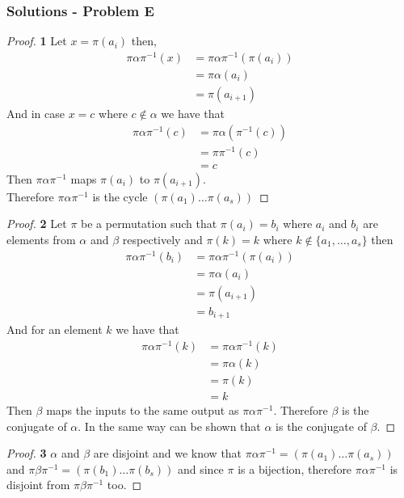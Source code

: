 \documentclass[11pt]{article}
\begin{document}
	\subsubsection*{Solutions - Problem E}
		\begin{proof}{\textbf{1}}
			Let $x = \pi(a_i)$ then,
			\begin{align*}
				\pi\alpha\pi^{-1}(x) &= \pi\alpha\pi^{-1}(\pi(a_i)) \\
									 &= \pi\alpha(a_i) \\
									 &= \pi(a_{i+1})
			\end{align*}
			And in case $x=c$ where $c \notin \alpha$ we have that
			\begin{align*}
				\pi\alpha\pi^{-1}(c) &= \pi\alpha(\pi^{-1}(c)) \\
									 &= \pi\pi^{-1}(c) \\
									 &= c
			\end{align*}
			Then $\pi\alpha\pi^{-1}$ maps $\pi(a_i)$ to $\pi(a_{i+1})$. \\ 
			Therefore $\pi\alpha\pi^{-1}$ is the cycle $(\pi(a_1) \dots \pi(a_s))$
		\end{proof}
\cleardoublepage
		\begin{proof}{\textbf{2}}
			Let $\pi$ be a permutation such that $\pi(a_i) = b_i$ where $a_i$
			and $b_i$ are elements from $\alpha$ and $\beta$ respectively and 
			$\pi(k) = k$ where $k \notin \{a_1, \dots, a_s\}$
			then
			\begin{align*}
				\pi\alpha\pi^{-1}(b_i) &= \pi\alpha\pi^{-1}(\pi(a_i)) \\
									   &= \pi\alpha(a_i) \\
									   &= \pi(a_{i+1}) \\
									   &= b_{i+1}
			\end{align*}
			And for an element $k$ we have that
			\begin{align*}
				\pi\alpha\pi^{-1}(k) &= \pi\alpha\pi^{-1}(k) \\
									   &= \pi\alpha(k) \\
									   &= \pi(k) \\
									   &= k
			\end{align*}
			Then $\beta$ maps the inputs to the same output as $\pi\alpha\pi^{-1}$.
			Therefore $\beta$ is the conjugate of $\alpha$. In the same way can be
			shown that $\alpha$ is the conjugate of $\beta$.
		\end{proof}
		\begin{proof}{\textbf{3}}
			$\alpha$ and $\beta$ are disjoint and we know that
			$\pi\alpha\pi^{-1} = (\pi(a_1) \dots \pi(a_s))$ and 
			$\pi\beta\pi^{-1} = (\pi(b_1) \dots \pi(b_s))$ and since $\pi$ is
			a bijection, therefore $\pi\alpha\pi^{-1}$ is disjoint from
			$\pi\beta\pi^{-1}$ too.
		\end{proof}
\end{document}
